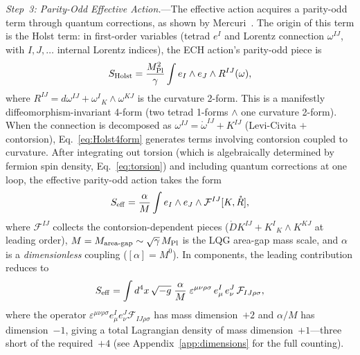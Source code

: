 \documentclass[aps,prd,twocolumn,superscriptaddress,showpacs,preprintnumbers,nofootinbib,longbibliography,floatfix]{revtex4-2}
\newcommand{\MPl}{M_{\rm Pl}}
\begin{document}
\textit{Step~3: Parity-Odd Effective Action.}---The effective action acquires a parity-odd term through quantum corrections, as shown by Mercuri~\cite{Mercuri2009}. The origin of this term is the Holst term: in first-order variables (tetrad $e^I$ and Lorentz connection $\omega^{IJ}$, with $I,J,\dots$ internal Lorentz indices), the ECH action's parity-odd piece is
\begin{equation}\label{eq:Holst4form}
S_{\rm Holst} = \frac{\MPl^2}{\gamma}\int e_I\wedge e_J\wedge R^{IJ}(\omega),
\end{equation}
where $R^{IJ}=d\omega^{IJ}+\omega^{I}_{\;\;K}\wedge\omega^{KJ}$ is the curvature 2-form. This is a manifestly diffeomorphism-invariant 4-form (two tetrad 1-forms $\wedge$ one curvature 2-form). When the connection is decomposed as $\omega^{IJ}=\mathring{\omega}^{IJ}+K^{IJ}$ (Levi-Civita $+$ contorsion), Eq.~\eqref{eq:Holst4form} generates terms involving contorsion coupled to curvature. After integrating out torsion (which is algebraically determined by fermion spin density, Eq.~\ref{eq:torsion}) and including quantum corrections at one loop, the effective parity-odd action takes the form
\begin{equation}\label{eq:Seff}
S_{\rm eff} = \frac{\alpha}{M}\int e_I\wedge e_J\wedge \mathcal{F}^{IJ}[K,\mathring{R}],
\end{equation}
where $\mathcal{F}^{IJ}$ collects the contorsion-dependent pieces ($\mathring{D}K^{IJ}+K^{I}_{\;\;K}\wedge K^{KJ}$ at leading order), $M = M_{\rm area\text{-}gap}\sim\sqrt{\gamma}\,\MPl$ is the LQG area-gap mass scale, and $\alpha$ is a \textit{dimensionless} coupling ($[\alpha]=M^0$). In components, the leading contribution reduces to
\begin{equation}\label{eq:Seff_comp}
S_{\rm eff} = \int d^4x\,\sqrt{-g}\;\frac{\alpha}{M}\;\varepsilon^{\mu\nu\rho\sigma}\,e^I_\mu\,e^J_\nu\,\mathcal{F}_{IJ\rho\sigma},
\end{equation}
where the operator $\varepsilon^{\mu\nu\rho\sigma}e^I_\mu e^J_\nu\mathcal{F}_{IJ\rho\sigma}$ has mass dimension~$+2$ and $\alpha/M$ has dimension~$-1$, giving a total Lagrangian density of mass dimension~$+1$---three short of the required~$+4$ (see Appendix~\ref{app:dimensions} for the full counting).
\end{document}
